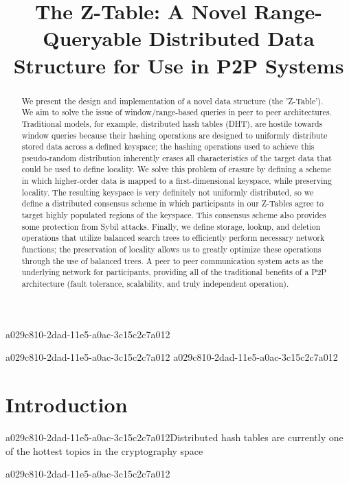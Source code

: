 \documentclass[12pt]{article}
\title{The Z-Table: A Novel Range-Queryable Distributed Data Structure for Use in P2P Systems}
\begin{document}
\maketitle

a029c810-2dad-11e5-a0ac-3c15c2c7a012\begin{abstract}
We present the design and implementation of a novel data structure (the 'Z-Table'). We aim to solve the issue of window/range-based queries in peer to peer architectures. Traditional models, for example,  distributed hash tables (DHT), are hostile towards window queries because their hashing operations are designed to uniformly distribute stored data across a defined keyspace; the hashing operations used to achieve this pseudo-random distribution inherently erases all characteristics of the target data that could be used to define locality. We solve this problem of erasure by defining a scheme in which higher-order data is mapped to a first-dimensional keyspace, while preserving locality. The resulting keyspace is very definitely not uniformly distributed, so we define a distributed consensus scheme in which participants in our Z-Tables agree to target highly populated regions of the keyspace. This consensus scheme also provides some protection from Sybil attacks. Finally, we define storage, lookup, and deletion operations that utilize balanced search trees to efficiently perform necessary network functions; the preservation of locality allows us to greatly optimize these operations through the use of balanced trees. A peer to peer communication system acts as the underlying network for participants, providing all of the traditional benefits of a P2P architecture (fault tolerance, scalability, and truly independent operation).
\end{abstract}

a029c810-2dad-11e5-a0ac-3c15c2c7a012
\newpage
a029c810-2dad-11e5-a0ac-3c15c2c7a012\section{Introduction}
a029c810-2dad-11e5-a0ac-3c15c2c7a012Distributed hash tables are currently one of the hottest topics in the cryptography space~\cite{Stoica:2001dj,Rowstron:2001ea,Ratnasamy:2001wn}

a029c810-2dad-11e5-a0ac-3c15c2c7a012\printbibliography
\end{document}
